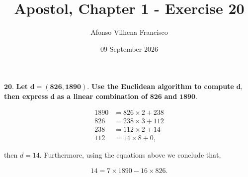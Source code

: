 \documentclass{article}
\title{Apostol, Chapter 1 - Exercise 20}
\author{Afonso Vilhena Francisco}
\date{09 September 2026}
\begin{document}
\maketitle

$\mathbf{20.}$ \textbf{Let} $\mathbf{d=(826,1890).}$ \textbf{Use the Euclidean algorithm to compute} $\mathbf{d,}$ \textbf{then express} $\mathbf{d}$ \textbf{as a linear combination of} $\mathbf{826}$ \textbf{and} $\mathbf{1890.}$ 

\vspace{0.5cm}

\begin{align*}
    1890 &= 826 \times 2 + 238 \\
    826  &= 238 \times 3 + 112 \\
    238  &= 112 \times 2 + 14 \\
    112  &= 14 \times 8 + 0,
\end{align*}

then $d=14.$ Furthermore, using the equations above we conclude that,

\begin{align*}
    14=7 \times 1890 -16 \times 826.
\end{align*}
\end{document}
